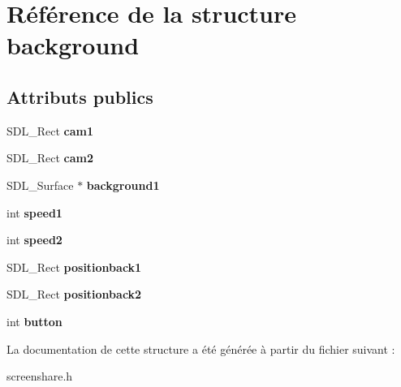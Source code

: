 \hypertarget{structbackground}{}\section{Référence de la structure background}
\label{structbackground}
\subsection*{Attributs publics}
\begin{DoxyCompactItemize}
\item 
\mbox{\label{structbackground_aea56460416b8693b4c4ff2d219a085f1}} 
S\+D\+L\+\_\+\+Rect {\bfseries cam1}
\item 
\mbox{\label{structbackground_a3b1b5599842fda657a547d85131ca676}} 
S\+D\+L\+\_\+\+Rect {\bfseries cam2}
\item 
\mbox{\label{structbackground_a71aceaee4e39742154ed8e14b585268d}} 
S\+D\+L\+\_\+\+Surface $\ast$ {\bfseries background1}
\item 
\mbox{\label{structbackground_aa82ba74be562583899f42d4d1aafd65f}} 
int {\bfseries speed1}
\item 
\mbox{\label{structbackground_a6a0fd003a47dd1ba30334279dd750222}} 
int {\bfseries speed2}
\item 
\mbox{\label{structbackground_a786f5b1835eebbf99c93c50ff94fa164}} 
S\+D\+L\+\_\+\+Rect {\bfseries positionback1}
\item 
\mbox{\label{structbackground_a2723e14d4ecb31ac91701cc202283cc4}} 
S\+D\+L\+\_\+\+Rect {\bfseries positionback2}
\item 
\mbox{\label{structbackground_a063c3ffbf0739c6d4d66088d5b863eab}} 
int {\bfseries button}
\end{DoxyCompactItemize}


La documentation de cette structure a été générée à partir du fichier suivant \+:\begin{DoxyCompactItemize}
\item 
screenshare.\+h\end{DoxyCompactItemize}

